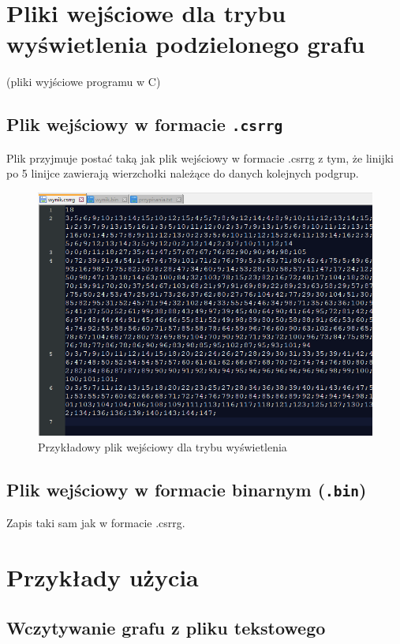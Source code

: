 \documentclass{article}
\begin{document}
\section{Pliki wejściowe dla trybu wyświetlenia podzielonego grafu}
    (pliki wyjściowe programu w C)

    \subsection{Plik wejściowy w formacie \texttt{.csrrg}}
    Plik przyjmuje postać taką jak plik wejściowy w formacie .csrrg z tym, że linijki po 5 linijce zawierają wierzchołki należące do danych kolejnych podgrup.
    \begin{figure}[H]
        \centering
        \includegraphics[width=0.9\linewidth]{img/plik_c.png}
        \caption{Przykładowy plik wejściowy dla trybu wyświetlenia}
        \label{fig:plik_c}
    \end{figure}

    \subsection{Plik wejściowy w formacie binarnym (\texttt{.bin})}
    Zapis taki sam jak w formacie .csrrg.

    



\section{Przykłady użycia}

    \subsection{Wczytywanie grafu z pliku tekstowego}
    
\end{document}
